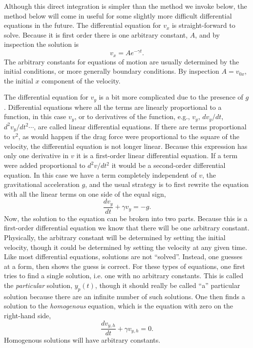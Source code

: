 Although this direct integration is simpler than the method we invoke below, the method below will come in useful for some slightly more difficult differential equations in the future. The differential equation for $v_x$ is straight-forward to solve. Because it is first order there is one arbitrary constant, $A$, and by inspection the solution is
\begin{equation}
v_x=Ae^{-\gamma t}.
\end{equation}
The arbitrary constants for equations of motion are usually determined by the initial conditions, or more generally boundary conditions. By inspection $A=v_{0x}$, the initial $x$ component of the velocity.

The differential equation for $v_y$ is a bit more complicated due to the presence of $g$. Differential equations where all the terms are linearly proportional to a function, in this case $v_y$, or to derivatives of the function, e.g., $v_y$, $dv_y/dt$, $d^2v_y/dt^2\cdots$, are called linear differential equations. If there are terms proportional to $v^2$, as would happen if the drag force were proportional to the square of the velocity, the differential equation is not longer linear. Because this expression has only one derivative in $v$ it is a first-order linear differential equation. If a term were added proportional to $d^2v/dt^2$ it would be a second-order differential equation.  In this case we have a term completely independent of $v$, the gravitational acceleration $g$, and the usual strategy is to first rewrite the equation with all the linear terms on one side of the equal sign,
\begin{equation}
\label{eq:generaleq}
\frac{dv_y}{dt}+\gamma v_y=-g.
\end{equation}
Now, the solution to the equation can be broken into two parts. Because this is a first-order differential equation we know that there will be one arbitrary constant. Physically, the arbitrary constant will be determined by setting the initial velocity, though it could be determined by setting the velocity at any given time. Like most differential equations, solutions are not ``solved''. Instead, one guesses at a form, then shows the guess is correct. For these types of equations, one first tries to find a single solution, i.e. one with no arbitrary constants. This is called the {\it particular} solution, $y_p(t)$, though it should really be called ``a'' particular solution because there are an infinite number of such solutions. One then finds a solution to the {\it homogenous} equation, which is the equation with zero on the right-hand side,
\begin{equation}
\frac{dv_{y,h}}{dt}+\gamma v_{y,h}=0.
\end{equation}
Homogenous solutions will have arbitrary constants. 


